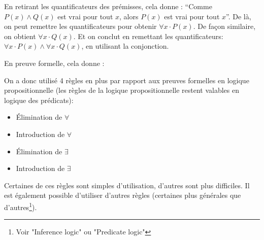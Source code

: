 En retirant les quantificateurs des prémisses, cela donne :
``Comme $P(x) \wedge Q(x)$ est vrai pour tout $x$, alors $P(x)$ est vrai pour tout $x$''. 
De là, on peut remettre les quantificateurs pour obtenir $\forall x \cdot P(x)$. De façon similaire, on obtient $\forall x \cdot Q(x)$. Et on conclut en remettant les quantificateurs: $\forall x \cdot P(x) \wedge \forall x \cdot Q(x)$, en utilisant la conjonction.

En preuve formelle, cela donne :

\begin{center}
\end{center}

On a donc utilisé 4 règles en plus par rapport aux preuves formelles en logique propositionnelle (les règles de la logique propositionnelle restent valables en logique des prédicats):
\begin{itemize}
\item Élimination de $\forall$
\item Introduction de $\forall$
\item Élimination de $\exists$
\item Introduction de $\exists$
\end{itemize}

Certaines de ces règles sont simples d'utilisation, d'autres sont plus difficiles.
Il est également possible d'utiliser d'autres règles (certaines plus générales que d'autres\footnote{Voir "Inference logic" ou "Predicate logic"}).

